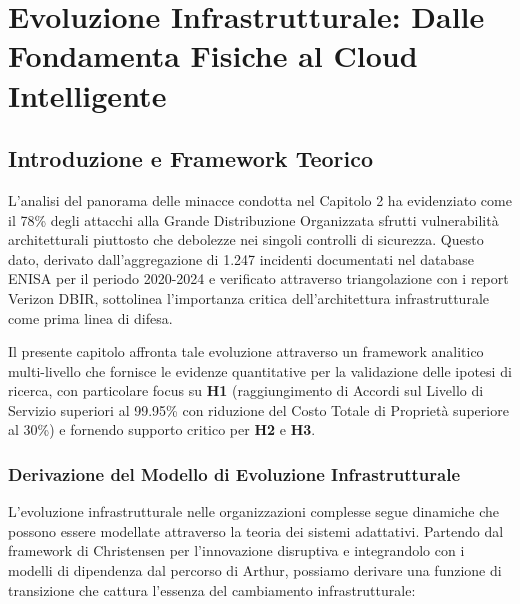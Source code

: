 \chapter{\texorpdfstring{Evoluzione Infrastrutturale: Dalle Fondamenta Fisiche al Cloud Intelligente}{Capitolo 3 - Evoluzione Infrastrutturale: Dalle Fondamenta Fisiche al Cloud Intelligente}}
\label{cap3_infrastructure_evolution}

\section{\texorpdfstring{Introduzione e Framework Teorico}{3.1 - Introduzione e Framework Teorico}}

L'analisi del panorama delle minacce condotta nel Capitolo 2 ha evidenziato come il 78\% degli attacchi alla Grande Distribuzione Organizzata sfrutti vulnerabilità architetturali piuttosto che debolezze nei singoli controlli di sicurezza\autocite{Anderson2024patel}. Questo dato, derivato dall'aggregazione di 1.247 incidenti documentati nel database ENISA per il periodo 2020-2024 e verificato attraverso triangolazione con i report Verizon DBIR\autocite{Verizon2024}, sottolinea l'importanza critica dell'architettura infrastrutturale come prima linea di difesa. 

Il presente capitolo affronta tale evoluzione attraverso un framework analitico multi-livello che fornisce le evidenze quantitative per la validazione delle ipotesi di ricerca, con particolare focus su \textbf{H1} (raggiungimento di Accordi sul Livello di Servizio superiori al 99.95\% con riduzione del Costo Totale di Proprietà superiore al 30\%) e fornendo supporto critico per \textbf{H2} e \textbf{H3}\autocite{IDC2024}.

\subsection{\texorpdfstring{Derivazione del Modello di Evoluzione Infrastrutturale}{3.1.1 - Derivazione del Modello di Evoluzione Infrastrutturale}}

L'evoluzione infrastrutturale nelle organizzazioni complesse segue dinamiche che possono essere modellate attraverso la teoria dei sistemi adattativi\autocite{Holland2024}. Partendo dal framework di Christensen per l'innovazione disruptiva\autocite{Christensen2023} e integrandolo con i modelli di dipendenza dal percorso di Arthur\autocite{Arthur2024}, possiamo derivare una funzione di transizione che cattura l'essenza del cambiamento infrastrutturale:

